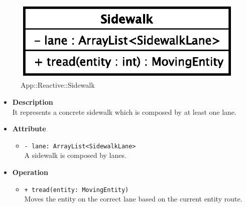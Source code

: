 \begin{figure}[h]
\centering
\includegraphics[scale=0.6,keepaspectratio]{images/solution/sidewalk.eps}
\caption{App::Reactive::Sidewalk}
\label{fig:sd-app-sidewalk}
\end{figure}
\FloatBarrier
\begin{itemize}
  \item \textbf{Description} \\
    It represents a concrete sidewalk which is composed by at least one lane.
  \item \textbf{Attribute}
  \begin{itemize}
    \item \texttt{- lane: ArrayList<SidewalkLane>} \\
A sidewalk is composed by lanes.
  \end{itemize}
  \item \textbf{Operation}
  \begin{itemize} 
    \item \texttt{+ tread(entity: MovingEntity)} \\
Moves the entity on the correct lane based on the current entity route. 
  \end{itemize}
\end{itemize}

